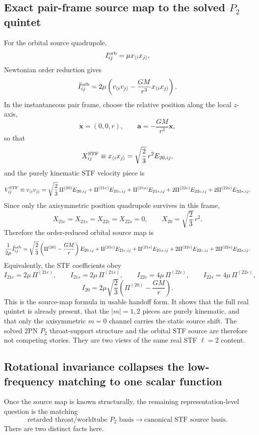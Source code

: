 \documentclass[11pt]{article}
\begin{document}
\subsection{Exact pair-frame source map to the solved \texorpdfstring{$P_2$}{P\_2} quintet}
\label{app:quad-ledger-source-map}

For the orbital source quadrupole,
\[
I_{ij}^{\rm orb}=\mu x_{\langle i}x_{j\rangle},
\]
Newtonian order reduction gives
\[
\ddot I_{ij}^{\rm orb}
=
2\mu\left(v_{\langle i}v_{j\rangle}-\frac{GM}{r^3}x_{\langle i}x_{j\rangle}\right).
\]
In the instantaneous pair frame, choose the relative position along the local
$z$-axis,
\[
\mathbf x=(0,0,r),
\qquad
\mathbf a=-\frac{GM}{r^3}\mathbf x,
\]
so that
\[
X_{ij}^{\rm STF}\equiv x_{\langle i}x_{j\rangle}
=
\sqrt{\frac23}\,r^2E_{20,ij},
\]
and the purely kinematic STF velocity piece is
\[
V_{ij}^{\rm STF}\equiv v_{\langle i}v_{j\rangle}
=
\sqrt{\frac23}\,\Pi^{(20)}E_{20,ij}
+\Pi^{(21c)}E_{21c,ij}
+\Pi^{(21s)}E_{21s,ij}
+2\Pi^{(22c)}E_{22c,ij}
+2\Pi^{(22s)}E_{22s,ij}.
\]
Since only the axisymmetric position quadrupole survives in this frame,
\[
X_{21c}=X_{21s}=X_{22c}=X_{22s}=0,
\qquad
X_{20}=\sqrt{\frac23}\,r^2.
\]
Therefore the order-reduced orbital source map is
\[
\frac{1}{2\mu}\ddot I_{ij}^{\rm orb}
=
\sqrt{\frac23}\left(\Pi^{(20)}-\frac{GM}{r}\right)E_{20,ij}
+\Pi^{(21c)}E_{21c,ij}
+\Pi^{(21s)}E_{21s,ij}
+2\Pi^{(22c)}E_{22c,ij}
+2\Pi^{(22s)}E_{22s,ij}.
\]
Equivalently, the STF coefficients obey
\[
I_{21c}=2\mu\,\Pi^{(21c)},
\qquad
I_{21s}=2\mu\,\Pi^{(21s)},
\qquad
I_{22c}=4\mu\,\Pi^{(22c)},
\qquad
I_{22s}=4\mu\,\Pi^{(22s)},
\]
\[
I_{20}=2\mu\sqrt{\frac23}\left(\Pi^{(20)}-\frac{GM}{r}\right).
\]
This is the source-map formula in usable handoff form.  It shows that the full
real quintet is already present, that the $|m|=1,2$ pieces are purely
kinematic, and that only the axisymmetric $m=0$ channel carries the static
source shift.  The solved $2$PN $P_2$ throat-support structure and the orbital
STF source are therefore not competing stories.  They are two views of the same
real STF $\ell=2$ content.

\subsection{Rotational invariance collapses the low-frequency matching to one scalar function}
\label{app:quad-ledger-matching}

Once the source map is known structurally, the remaining representation-level
question is the matching
\[
\text{retarded throat/worldtube }P_2\text{ basis}
\longrightarrow
\text{canonical STF source basis}.
\]
There are two distinct facts here.
\end{document}
